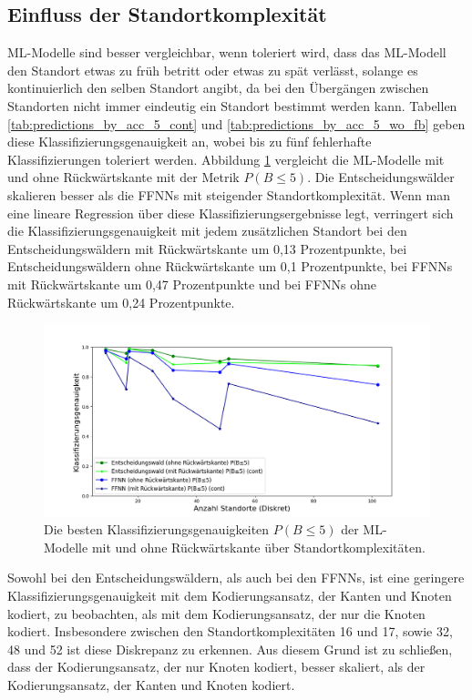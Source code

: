 \subsection{Einfluss der Standortkomplexität}
ML-Modelle sind besser vergleichbar, wenn toleriert wird, dass das ML-Modell den Standort etwas zu früh betritt oder etwas zu spät verlässt,
solange es kontinuierlich den selben Standort angibt, da bei den Übergängen zwischen Standorten nicht immer eindeutig ein Standort bestimmt werden kann.
Tabellen \ref{tab:predictions_by_acc_5_cont} und \ref{tab:predictions_by_acc_5_wo_fb} geben diese Klassifizierungsgenauigkeit an,
wobei bis zu fünf fehlerhafte Klassifizierungen toleriert werden.
\newline
\newline
Abbildung \ref{fig:best_dt_vs_knn_pb_5_vs_pb_5_cont} vergleicht die ML-Modelle mit und ohne Rückwärtskante mit der Metrik $P(B\leq5)$.
Die Entscheidungswälder skalieren besser als die FFNNs mit steigender Standortkomplexität.
Wenn man eine lineare Regression über diese Klassifizierungsergebnisse legt,
verringert sich die Klassifizierungsgenauigkeit mit jedem zusätzlichen Standort bei den Entscheidungswäldern mit Rückwärtskante um 0,13 Prozentpunkte,
bei Entscheidungswäldern ohne Rückwärtskante um 0,1 Prozentpunkte,
bei FFNNs mit Rückwärtskante um 0,47 Prozentpunkte und bei FFNNs ohne Rückwärtskante um 0,24 Prozentpunkte.
\begin{figure}[h!]
    \centering
    \includegraphics[width=\linewidth]{images/best_dt_vs_knn_pb_5_vs_pb_5_cont.png}
    \caption{Die besten Klassifizierungsgenauigkeiten $P(B\leq5)$ der ML-Modelle mit und ohne Rückwärtskante über Standortkomplexitäten.}
    \label{fig:best_dt_vs_knn_pb_5_vs_pb_5_cont}
\end{figure}
\newline
\newline
Sowohl bei den Entscheidungswäldern, als auch bei den FFNNs, ist eine geringere Klassifizierungsgenauigkeit mit dem Kodierungsansatz, der Kanten und Knoten kodiert,
zu beobachten, als mit dem Kodierungsansatz, der nur die Knoten kodiert.
Insbesondere zwischen den Standortkomplexitäten 16 und 17, sowie 32, 48 und 52 ist diese Diskrepanz zu erkennen.
Aus diesem Grund ist zu schließen, dass der Kodierungsansatz, der nur Knoten kodiert, besser skaliert, als der Kodierungsansatz, der Kanten und Knoten kodiert.

